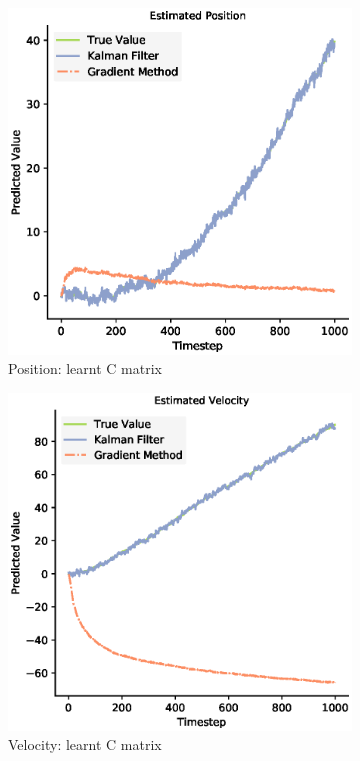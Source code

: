 \begin{figure}
 \begin{subfigure}{0.33\textwidth}
 \centering
 \includegraphics[width=.8\linewidth]{chapter_3_figures/Estimated_Position_C_matrix.eps}
 \caption{Position: learnt C matrix}
 \end{subfigure}%
 \begin{subfigure}{0.33\textwidth}
 \centering
 \includegraphics[width=.8\linewidth]{chapter_3_figures/Estimated_Velocity_C_matrix.eps}
 \caption{Velocity: learnt C matrix}
 \end{subfigure}
 \begin{subfigure}{0.33\textwidth}\quad

\end{subfigure}
\end{figure}
